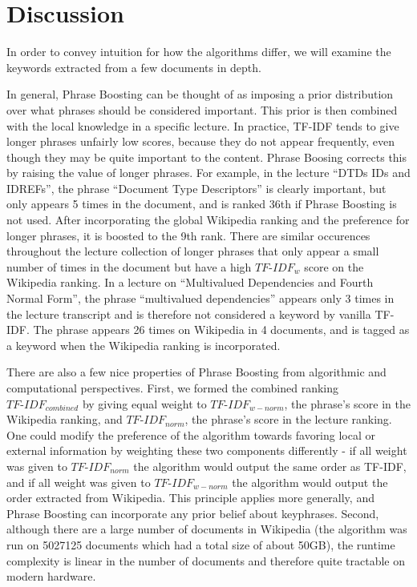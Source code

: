 \section{Discussion}
\label{sed:discussion}

In order to convey intuition for how the algorithms differ, we will examine the keywords extracted from a few documents in depth.

In general, Phrase Boosting can be thought of as imposing a prior distribution over what phrases should be considered important. This prior is then combined with the local knowledge in a specific lecture. In practice, TF-IDF tends to give longer phrases unfairly low scores, because they do not appear frequently, even though they may be quite important to the content. Phrase Boosing corrects this by raising the value of longer phrases. For example, in the lecture ``DTDs IDs and IDREFs'', the phrase ``Document Type Descriptors'' is clearly important, but only appears 5 times in the document, and is ranked 36th if Phrase Boosting is not used. After incorporating the global Wikipedia ranking and the preference for longer phrases, it is boosted to the 9th rank. There are similar occurences throughout the lecture collection of longer phrases that only appear a small number of times in the document but have a high $TF\text{-}IDF_w$ score on the Wikipedia ranking. In a lecture on ``Multivalued Dependencies and Fourth Normal Form'', the phrase ``multivalued dependencies'' appears only 3 times in the lecture transcript and is therefore not considered a keyword by vanilla TF-IDF. The phrase appears 26 times on Wikipedia in 4 documents, and is tagged as a keyword when the Wikipedia ranking is incorporated.

There are also a few nice properties of Phrase Boosting from algorithmic and computational perspectives. First, we formed the combined ranking $TF\text{-}IDF_{combined}$ by giving equal weight to $TF\text{-}IDF_{w-norm}$, the phrase's score in the Wikipedia ranking, and $TF\text{-}IDF_{norm}$, the phrase's score in the lecture ranking. One could modify the preference of the algorithm towards favoring local or external information by weighting these two components differently - if all weight was given to $TF\text{-}IDF_{norm}$ the algorithm would output the same order as TF-IDF, and if all weight was given to $TF\text{-}IDF_{w-norm}$ the algorithm would output the order extracted from Wikipedia. This principle applies more generally, and Phrase Boosting can incorporate any prior belief about keyphrases. Second, although there are a large number of documents in Wikipedia (the algorithm was run on 5027125 documents which had a total size of about 50GB), the runtime complexity is linear in the number of documents and therefore quite tractable on modern hardware.

